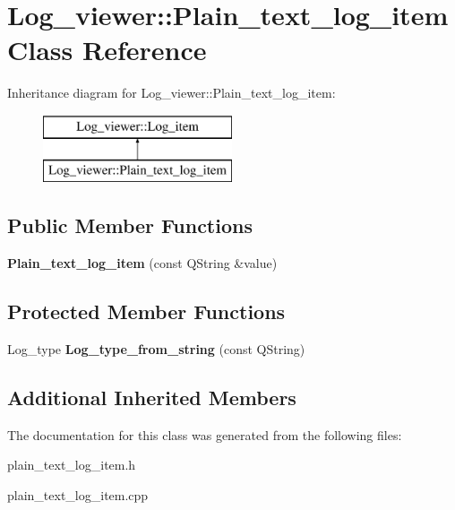 \hypertarget{class_log__viewer_1_1_plain__text__log__item}{\section{Log\-\_\-viewer\-:\-:Plain\-\_\-text\-\_\-log\-\_\-item Class Reference}
\label{class_log__viewer_1_1_plain__text__log__item}
}
Inheritance diagram for Log\-\_\-viewer\-:\-:Plain\-\_\-text\-\_\-log\-\_\-item\-:\begin{figure}[H]
\begin{center}
\leavevmode
\includegraphics[height=2.000000cm]{class_log__viewer_1_1_plain__text__log__item}
\end{center}
\end{figure}
\subsection*{Public Member Functions}
\begin{DoxyCompactItemize}
\item 
\hypertarget{class_log__viewer_1_1_plain__text__log__item_ab989811bd6b3df0029a04c181befa323}{{\bfseries Plain\-\_\-text\-\_\-log\-\_\-item} (const Q\-String \&value)}\label{class_log__viewer_1_1_plain__text__log__item_ab989811bd6b3df0029a04c181befa323}

\end{DoxyCompactItemize}
\subsection*{Protected Member Functions}
\begin{DoxyCompactItemize}
\item 
\hypertarget{class_log__viewer_1_1_plain__text__log__item_a2f5b569bfdfabd9c4d71f0a1f009de5b}{Log\-\_\-type {\bfseries Log\-\_\-type\-\_\-from\-\_\-string} (const Q\-String)}\label{class_log__viewer_1_1_plain__text__log__item_a2f5b569bfdfabd9c4d71f0a1f009de5b}

\end{DoxyCompactItemize}
\subsection*{Additional Inherited Members}


The documentation for this class was generated from the following files\-:\begin{DoxyCompactItemize}
\item 
plain\-\_\-text\-\_\-log\-\_\-item.\-h\item 
plain\-\_\-text\-\_\-log\-\_\-item.\-cpp\end{DoxyCompactItemize}
